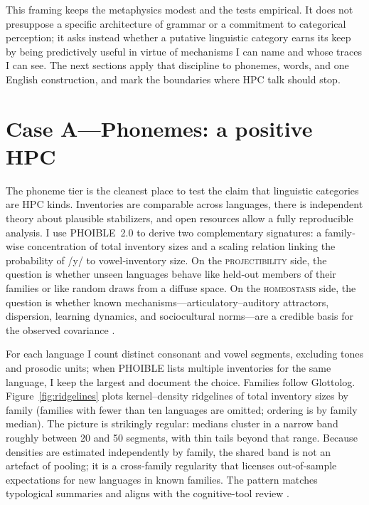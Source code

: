 \documentclass[12pt]{article}
\begin{document}
This framing keeps the metaphysics modest and the tests empirical. It does not presuppose a specific architecture of grammar or a commitment to categorical perception; it asks instead whether a putative linguistic category earns its keep by being predictively useful in virtue of mechanisms I can name and whose traces I can see. The next sections apply that discipline to phonemes, words, and one English construction, and mark the boundaries where \textsc{HPC} talk should stop.


\section{Case A—Phonemes: a positive HPC}\label{sec:case-phoneme}

The phoneme tier is the cleanest place to test the claim that linguistic categories are HPC kinds. Inventories are comparable across languages, there is independent theory about plausible stabilizers, and open resources allow a fully reproducible analysis. I use PHOIBLE~2.0 \citep{MoranEtAl2019PHOIBLE} to derive two complementary signatures: a family‐wise concentration of total inventory sizes and a scaling relation linking the probability of /y/ to vowel‐inventory size. On the \textsc{projectibility} side, the question is whether unseen languages behave like held‐out members of their families or like random draws from a diffuse space. On the \textsc{homeostasis} side, the question is whether known mechanisms—articulatory–auditory attractors, dispersion, learning dynamics, and sociocultural norms—are a credible basis for the observed covariance \citep{Stevens1989Quantal,LiljencrantsLindblom1972,Lindblom1990HandH,Ekstrom2025PhonemeTool}.

For each language I count distinct consonant and vowel segments, excluding tones and prosodic units; when PHOIBLE lists multiple inventories for the same language, I keep the largest and document the choice. Families follow Glottolog. Figure~\ref{fig:ridgelines} plots kernel–density ridgelines of total inventory sizes by family (families with fewer than ten languages are omitted; ordering is by family median). The picture is strikingly regular: medians cluster in a narrow band roughly between 20 and 50 segments, with thin tails beyond that range. Because densities are estimated independently by family, the shared band is not an artefact of pooling; it is a cross‐family regularity that licenses out‐of‐sample expectations for new languages in known families. The pattern matches typological summaries and aligns with the cognitive-tool review \citep[Fig.\,1]{Ekstrom2025PhonemeTool}.
\end{document}
